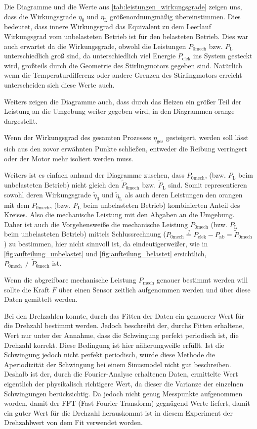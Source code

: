 \documentclass[11pt]{scrartcl}
\begin{document}
Die Diagramme und die Werte aus \autoref{tab:leistungen_wirkungsgrade} zeigen
uns, dass die Wirkungsgrade $\eta_{0}$ und $\eta_{\text{L}}$ größenordnungmäßig
übereinstimmen. Dies bedeutet, dass innere Wirkungsgrad das Equivalent zu dem
Leerlauf Wirkungsgrad vom unbelasteten Betrieb ist für den belasteten Betrieb.
Dies war auch erwartet da die Wirkungsgrade, obwohl die Leistungen
$P_{\text{0mech}}$ bzw. $P_{\text{L}}$ unterschiedlich groß sind, da
unterschiedlich viel Energie $P_{\text{elek}}$ ins System gesteckt wird,
großteils durch die Geometrie des Stirlingmotors gegeben sind. Natürlich wenn
die Temperaturdifferenz oder andere Grenzen des Stirlingmotors erreicht
unterscheiden sich diese Werte auch. 

Weiters zeigen die Diagramme auch, dass durch das Heizen ein größer Teil der
Leistung an die Umgebung weiter gegeben wird, in den Diagrammen orange dargestellt.

Wenn der Wirkungsgrad des gesamten Prozesses $\eta_{\text{ges}}$ gesteigert, werden
soll lässt sich aus den zovor erwähnten Punkte schließen, entweder die
Reibung verringert oder der Motor mehr isoliert werden muss.

Weiters ist es einfach anhand der Diagramme zusehen, dass $P_{\text{0mech}}$,
(bzw. $P_{\text{L}}$ beim unbelasteten Betrieb) nicht gleich den
$\tilde{P}_{\text{0mech}}$ bzw. $\tilde{P}_{\text{L}}$ sind. Somit
representieren sowohl deren Wirkungsgrade $\tilde{\eta}_{0}$ und
$\tilde{\eta}_{\text{L}}$ als auch deren Leistungen den orangen mit dem
$P_{\text{0mech}}$, (bzw. $P_{\text{L}}$ beim unbelasteten Betrieb)
kombinierten Anteil des Kreises. Also die mechanische Leistung mit den Abgaben
an die Umgebung. Daher ist auch die Vorgehensweiße die mechanische Leistung
$P_{\text{0mech}}$ (bzw.  $P_{\text{L}}$ beim unbelasteten Betrieb) mittels
Schlussrechnung ($P_{\text{0mech}} \stackrel{?}{=}
P_{\text{elek}}-P_{\text{ab}} = \tilde{P}_{\text{0mech}}$) zu bestimmen, hier
nicht sinnvoll ist, da eindeutigerweißer, wie in \autoref{fig:aufteilung_unbelastet} und
\autoref{fig:aufteilung_belastet} ersichtlich,  $P_{\text{0mech}} \neq
\tilde{P}_{\text{0mech}}$ ist.

Wenn die abgreifbare mechanische Leistung $P_{\text{mech}}$ genauer bestimmt werden
will sollte die Kraft $F$ über einen Sensor zeitlich aufgenommen werden und
über diese Daten gemittelt werden.

Bei den Drehzahlen konnte, durch das Fitten der Daten ein genauerer Wert für
die Drehzahl bestimmt werden. Jedoch beschreibt der, durchs Fitten erhaltene,
Wert nur unter der Annahme, dass die Schwingung perfekt periodisch ist, die
Drehzahl korrekt.  Diese Bedingung ist hier näherungweiße erfüllt. Ist die
Schwingung jedoch nicht perfekt periodisch, würde diese Methode die
Aperiodizität der Schwingung bei einem Sinusmodel nicht gut beschreiben.
Deshalb ist der, durch die Fourier-Analyse erhaltenen Daten, ermittelte Wert
eigentlich der physikalisch richtigere Wert, da dieser die Varianze der
einzelnen Schwingungen berücksichtig. Da jedoch nicht genug Messpunkte
aufgenommen worden, damit der FFT (Fast-Fourier-Transform) gegnügend Werte liefert, damit ein guter Wert
für die Drehzahl herauskommt ist in diesem Experiment der Drehzahlwert von dem
Fit verwendet worden.
\end{document}
